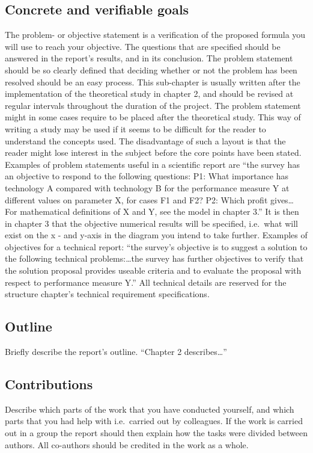 \subsection{Concrete and verifiable goals}\label{subsec:goals}
\noindent
The problem- or objective statement is a verification of the proposed formula
you will use to reach your objective. The questions that are specified should be
answered in the report's results, and in its conclusion. The problem statement
should be so clearly defined that deciding whether or not the problem has been
resolved should be an easy process. This sub-chapter is usually written after
the implementation of the theoretical
study in chapter 2, and should be revised at regular intervals throughout the
duration of the project. The problem statement might in some cases require to be
placed after the theoretical study. This way of writing a study may be used if
it seems to be difficult for the reader to understand the concepts used. The
disadvantage of such a layout is that the reader might lose interest in the
subject before the core points have been stated. Examples of problem statements
useful in a scientific report are ``the survey has
an objective to respond to the following questions: P1: What importance has
technology A compared with technology B for the performance measure Y at
different values on parameter X, for cases F1 and F2? P2: Which profit gives…
For mathematical definitions of X and Y, see the model in chapter 3.'' It is then
in chapter 3 that the objective numerical results will be specified, i.e.\ what
will exist on the x - and y-axis in the diagram you intend to take further.
Examples of objectives for a technical report: ``the survey's objective is to
suggest a solution to the following technical problems:\dots the survey has
further objectives to verify that the solution proposal provides useable
criteria and to evaluate the proposal with respect to performance measure Y.''
All technical details are reserved for the structure chapter's technical
requirement specifications.

\subsection{Outline}\label{subsec:outline}
\noindent
Briefly describe the report's outline. ``Chapter 2 describes\dots''

\subsection{Contributions}\label{subsec:contributions}
\noindent 
Describe which parts of the work that you have conducted yourself, and which
parts that you had help with i.e.\ carried out by colleagues. If the work is
carried out in a group the report should then explain how the tasks were divided
between authors. All co-authors should be credited in the work as a whole.
